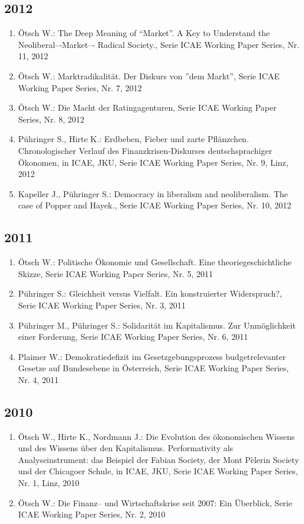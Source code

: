 \subsection*{2012}
\begin{enumerate}
    	 \item Ötsch W.: The Deep Meaning of “Market”. A Key to Understand the Neoliberal--­‐Market--­‐ Radical Society., Serie ICAE Working Paper Series, Nr. 11, 2012
	 \item Ötsch W.: Marktradikalität. Der Diskurs von ''dem Markt'', Serie ICAE Working Paper Series, Nr. 7, 2012
	 \item Ötsch W.: Die Macht der Ratingagenturen, Serie ICAE Working Paper Series, Nr. 8, 2012
	 \item Pühringer S., Hirte K.: Erdbeben, Fieber und zarte Pflänzchen. Chronologischer Verlauf des Finanzkrisen‐Diskurses deutschsprachiger Ökonomen, in ICAE, JKU, Serie ICAE Working Paper Series, Nr. 9, Linz, 2012
	 \item Kapeller J., Pühringer S.: Democracy in liberalism and neoliberalism. The case of Popper and Hayek., Serie ICAE Working Paper Series, Nr. 10, 2012
\end{enumerate}
\subsection*{2011}
\begin{enumerate}
    	 \item Ötsch W.: Politische Ökonomie und Gesellschaft. Eine theoriegeschichtliche Skizze, Serie ICAE Working Paper Series, Nr. 5, 2011
	 \item Pühringer S.: Gleichheit versus Vielfalt. Ein konstruierter Widerspruch?, Serie ICAE Working Paper Series, Nr. 3, 2011
	 \item Pühringer M., Pühringer S.: Solidarität im Kapitalismus. Zur Unmöglichkeit einer Forderung, Serie ICAE Working Paper Series, Nr. 6, 2011
	 \item Plaimer W.: Demokratiedefizit im Gesetzgebungsprozess budgetrelevanter Gesetze auf Bundesebene in Österreich, Serie ICAE Working Paper Series, Nr. 4, 2011
\end{enumerate}
\subsection*{2010}
\begin{enumerate}
    	 \item Ötsch W., Hirte K., Nordmann J.: Die Evolution des ökonomischen Wissens und des Wissens über den Kapitalismus. Performativity als Analyseinstrument: das Beispiel der Fabian Society, der Mont Pèlerin Society und der Chicagoer Schule, in ICAE, JKU, Serie ICAE Working Paper Series, Nr. 1, Linz, 2010
	 \item Ötsch W.: Die Finanz--­ und Wirtschaftskrise seit 2007: Ein Überblick, Serie ICAE Working Paper Series, Nr. 2, 2010
\end{enumerate}
